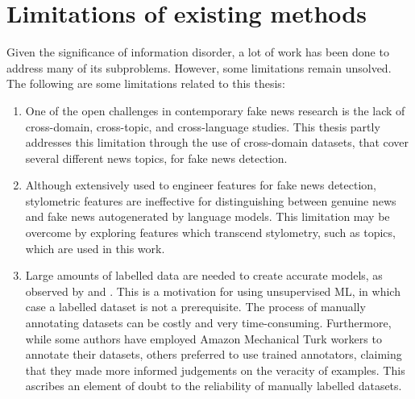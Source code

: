 \section{Limitations of existing methods}
\label{sec:2-limitations}

Given the significance of information disorder, a lot of work has been done to address many of its subproblems. However, some limitations remain unsolved. The following are some limitations related to this thesis:

\begin{enumerate}
    \item One of the open challenges in contemporary fake news research is the lack of cross-domain, cross-topic, and cross-language studies. This thesis partly addresses this limitation through the use of cross-domain datasets, that cover several different news topics, for fake news detection.

    \item Although extensively used to engineer features for fake news detection, stylometric features are ineffective for distinguishing between genuine news and fake news autogenerated by language models. This limitation may be overcome by exploring features which transcend stylometry, such as topics, which are used in this work.

    \item Large amounts of labelled data are needed to create accurate models, as observed by  and . This is a motivation for using unsupervised \ac{ML}, in which case a labelled dataset is not a prerequisite. The process of manually annotating datasets can be costly and very time-consuming. Furthermore, while some authors have employed Amazon Mechanical Turk workers to annotate their datasets, others preferred to use trained annotators, claiming that they made more informed judgements on the veracity of examples. This ascribes an element of doubt to the reliability of manually labelled datasets.
\end{enumerate}
